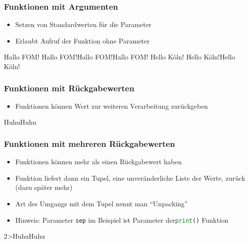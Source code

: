 \documentclass[ngerman]{beamer}
\newcommand{\ta}[1]{\textattachfile[color=1 0 0]{#1}{Code}}
\begin{document}
\begin{frame}[containsverbatim]
\frametitle{Funktionen mit Argumenten}

\begin{itemize}
	\item Setzen von Standardwerten für die Parameter
	\item Erlaubt Aufruf der Funktion ohne Parameter
\end{itemize}

%

\begin{ausgabe}
Hallo FOM!
Hallo FOM!Hallo FOM!Hallo FOM!
Hello Köln!
Hello Köln!Hello Köln!
\end{ausgabe}

\end{frame}

\begin{frame}[containsverbatim]
\frametitle{Funktionen mit Rückgabewerten}

\begin{itemize}
	\item Funktionen können Wert zur weiteren Verarbeitung zurückgeben
\end{itemize}

%

\begin{ausgabe}
HuhuHuhu
\end{ausgabe}

\end{frame}


\begin{frame}[containsverbatim]
\frametitle{Funktionen mit mehreren Rückgabewerten}

\begin{itemize}
	\item Funktionen können mehr als einen Rückgabewert haben
	\item Funktion liefert dann ein Tupel, eine unveränderliche Liste der Werte, zurück (dazu später mehr)
	\item Art des Umgangs mit dem Tupel nennt man \enquote{Unpacking}
	\item Hinweis: Parameter \texttt{sep} im Beispiel ist Parameter der\newline \lstinline[language={Python}]{print()}  Funktion
\end{itemize}

%

\vspace*{-1em}
\begin{ausgabe}
2>HuhuHuhu
\end{ausgabe}
\end{frame}
\end{document}
